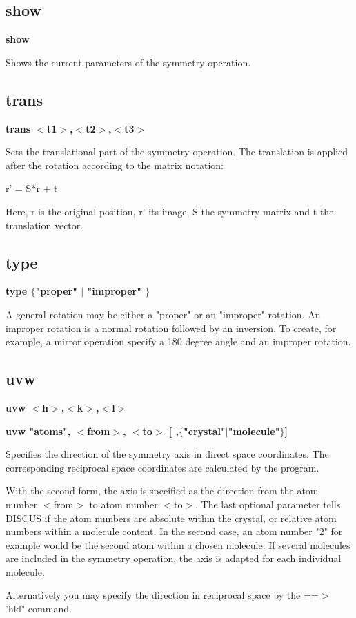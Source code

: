 \subsection*{show}
{\bf show \par }
\par
\vspace{3pt}
Shows the current parameters of the symmetry operation. 
\subsection*{trans}
{\bf trans $ <$t1$> $,$ <$t2$> $,$ <$t3$> $ \par }
\par
\vspace{3pt}
Sets the translational part of the symmetry operation. 
The translation is applied after the rotation according to the matrix 
notation: 
\par
\begin{MacVerbatim}
r' = S*r + t
\end{MacVerbatim}
Here, r is the original position, r' its image, S the symmetry matrix 
and t the translation vector. 
\subsection*{type}
{\bf type $ \{$"proper" $| $ "improper" $\} $ \par }
\par
\vspace{3pt}
A general rotation may be either a "proper" or an "improper" rotation. 
An improper rotation is a normal rotation followed by an inversion. 
To create, for example, a mirror operation specify a 180 degree angle 
and an improper rotation. 
\subsection*{uvw}
{\bf uvw $ <$h$> $,$ <$k$> $,$ <$l$> $ \par }
{\bf uvw "atoms", $ <$from$> $, $ <$to$> $ [ ,$ \{$"crystal"$| $"molecule"$\} $] \par }
\par
\vspace{3pt}
Specifies the direction of the symmetry axis in direct space 
coordinates. The corresponding reciprocal space coordinates are calculated 
by the program. 
\par
With the second form, the axis is specified as the direction from 
the atom number $ <$from$> $ to atom number $ <$to$> $. 
The last optional parameter tells DISCUS if the atom numbers are 
absolute within the crystal, or relative atom numbers within a molecule 
content. 
In the second case, an atom number "2" for example would be the second 
atom within a chosen molecule. If several molecules are included in the 
symmetry operation, the axis is adapted for each individual molecule. 
\par
Alternatively you may specify the direction in reciprocal space by the 
==$> $ 'hkl" command. 
\par
